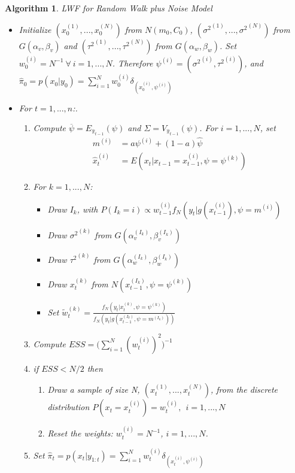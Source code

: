 \documentclass[
]{book}
\theoremstyle{break}
\theoremstyle{nonumberplain}
\newtheorem{algorithm}{Algorithm}[section]
\begin{document}
\begin{algorithm} LWF for Random Walk plus Noise Model
\begin{itemize}
\item Initialize $(x_{0}^{(1)},...,x_{0}^{(N)})$ from $N(m_{0},C_{0})$, $({\sigma^{2}}^{(1)},...,{\sigma^{2}}^{(N)})$ from $G(\alpha_{v},\beta_{v})$ and $({\tau^{2}}^{(1)},...,{\tau^{2}}^{(N)})$ from $G(\alpha_{w},\beta_{w})$. Set $w_{0}^{(i)}=N^{-1} \ \forall \ i=1,...,N$. Therefore $\psi^{(i)}=({\sigma^{2}}^{(i)},{\tau^{2}}^{(i)})$, and
$\hat{\pi}_{0}=p(x_{0}|y_{0})=\sum_{i=1}^{N}w_{0}^{(i)}\delta_{(x_{0}^{(i)},\psi^{(i)})}$
\item For $t=1,...,n$:.
\begin{enumerate}
\item Compute $\overline{\psi}=E_{\hat{\pi}_{t-1}}(\psi)$ and $\Sigma=V_{\hat{\pi}_{t-1}}(\psi)$. For $i=1,...,N$, set
\begin{align*}
m^{(i)} & = a\psi^{(i)}+(1-a)\hat{\psi} \\
\hat{x}_{t}^{(i)} & = E(x_{t}|x_{t-1}=x_{t-1}^{(i)},\psi=\psi^{(k)})
\end{align*}
\item For $k=1,...,N$:
\begin{itemize}
\item Draw $I_{k}$, with $P(I_{k}=i) \propto w_{t-1}^{(i)}f_{N}(y_{t}|g(x_{t-1}^{(i)}),\psi=m^{(i)}) $
\item Draw ${\sigma^{2}}^{(k)}$ from $G(\alpha_{v}^{(I_k)},\beta_{v}^{(I_k)})$ 
\item Draw ${\tau^{2}}^{(k)}$ from $G(\alpha_{w}^{(I_k)},\beta_{w}^{(I_k)})$
\item Draw $x_{t}^{(k)}$ from $N(x_{t-1}^{(I_k)},\psi=\psi^{(k)})$
\item Set  $\tilde{w}_{t}^{(k)} = \frac{f_{N}(y_{t}|x_{t}^{(k)},\psi=\psi^{(k)})}{f_{N}(y_{t}|g(x_{t-1}^{(I_{k})},\psi=m^{(I_k)}))}$
\end{itemize}
\item Compute $ESS=\Bigg(\sum_{i=1}^{N}(w_{t}^{(i)})^{2}\Bigg)^{-1}$
\item if $ESS<N/2$ then
\begin{enumerate}
\item Draw a sample of size N, $(x_{t}^{(1)},...,x_{t}^{(N)})$, from the discrete distribution $P(x_{t}=x_{t}^{(i)})=w_{t}^{(i)},\ \ i=1,...,N$
\item Reset the weights: $w_{t}^{(i)}=N^{-1}$, $i=1,...,N$.
\end{enumerate}
\item Set $\hat{\pi}_{t}=p(x_{t}|y_{1:t})=\sum_{i=1}^{N}w_{t}^{(i)}\delta_{(x_{t}^{(i)},\psi^{(i)})}$
\end{enumerate}
\end{itemize}
\end{algorithm}
\end{document}
